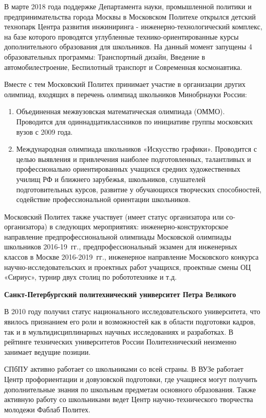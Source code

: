 В марте 2018 года поддержке Департамента науки, промышленной политики и предпринимательства города Москвы в Московском Политехе открылся детский технопарк Центра развития инжиниринга - инженерно-технологический комплекс, на базе которого проводятся углубленные технико-ориентированные курсы дополнительного образования для школьников. На данный момент запущены 4 образовательных программы: Транспортный дизайн, Введение в автомобилестроение, Беспилотный транспорт и Современная космонавтика.

Вместе с тем Московский Политех принимает участие в организации других олимпиад, входящих в перечень олимпиад школьников Минобрнауки России:
\begin{enumerate}
    \item Объединенная межвузовская математическая олимпиада (ОММО). Проводится для одиннадцатиклассников по инициативе группы московских вузов с 2009 года.
    \item Международная олимпиада школьников «Искусство графики». Проводится с целью выявления и привлечения наиболее подготовленных, талантливых и профессионально ориентированных учащихся средних художественных училищ РФ и ближнего зарубежья, школьников, слушателей подготовительных курсов, развитие у обучающихся творческих способностей, содействие профессиональной ориентации школьников.
\end{enumerate}

Московский Политех также участвует (имеет статус организатора или со-\linebreak организатора) в следующих мероприятиях: инженерно-конструкторское направление предпрофессиональной олимпиады Московской олимпиады школьников 2016-19~гг., предпрофессиональный экзамен для инженерных классов в Москве 2016-2019~гг., инженерное направление Московского конкурса научно-исследовательских и проектных работ учащихся, проектные смены ОЦ «Сириус», турнир двух столиц по робототехнике и т.д.

\textbf{Санкт-Петербургский политехнический университет Петра Великого}

В 2010 году получил статус национального исследовательского университета, что явилось признанием его роли и возможностей как в области подготовки кадров, так и в мультидисциплинарных научных исследованиях и разработках. В рейтинге технических университетов России Политехнический неизменно занимает ведущие позиции.

СПбПУ активно работает со школьниками со всей страны. В ВУЗе работает Центр профориентации и довузовской подготовки, где учащиеся могут получить дополнительные знания по школьным предметам основного образования. Также активную работу со школьниками ведет Центр научно-технического творчества молодежи Фаблаб Политех.

